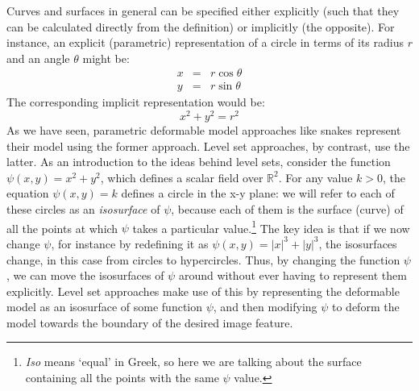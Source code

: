 Curves and surfaces in general can be specified either explicitly (such that they can be calculated directly from the definition) or implicitly (the opposite). For instance, an explicit (parametric) representation of a circle in terms of its radius $r$ and an angle $\theta$ might be:
%
\begin{eqnarray*}
x & = & r \cos \theta \\
y & = & r \sin \theta
\end{eqnarray*}
%
The corresponding implicit representation would be:
%
\[
x^2 + y^2 = r^2
\]
%
As we have seen, parametric deformable model approaches like snakes represent their model using the former approach. Level set approaches, by contrast, use the latter. As an introduction to the ideas behind level sets, consider the function $\psi(x,y) = x^2 + y^2$, which defines a scalar field over $\mathbb{R}^2$. For any value $k > 0$, the equation $\psi(x,y) = k$ defines a circle in the x-y plane: we will refer to each of these circles as an \emph{isosurface} of $\psi$, because each of them is the surface (curve) of all the points at which $\psi$ takes a particular value.\footnote{\emph{Iso} means `equal' in Greek, so here we are talking about the surface containing all the points with the same $\psi$ value.} The key idea is that if we now change $\psi$, for instance by redefining it as $\psi(x,y) = |x|^3 + |y|^3$, the isosurfaces change, in this case from circles to hypercircles. Thus, by changing the function $\psi$, we can move the isosurfaces of $\psi$ around without ever having to represent them explicitly. Level set approaches make use of this by representing the deformable model as an isosurface of some function $\psi$, and then modifying $\psi$ to deform the model towards the boundary of the desired image feature.




